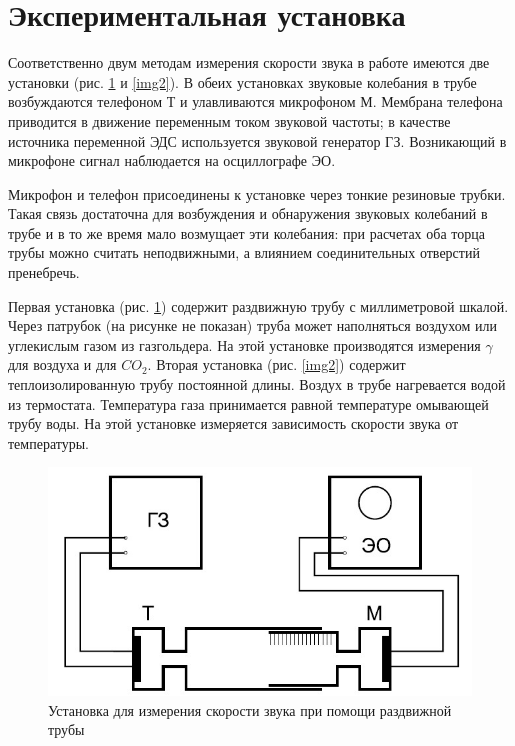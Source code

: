 \documentclass[a4paper,12pt]{article}
\theoremstyle{definition}
\begin{document}
	\section{Экспериментальная установка}
	
	Соответственно двум методам измерения скорости звука в работе имеются две установки (рис. \ref{img1} и \ref{img2}). В обеих установках звуковые колебания в трубе возбуждаются телефоном Т и улавливаются микрофоном М. Мембрана телефона приводится в движение переменным током звуковой частоты; в качестве источника переменной ЭДС используется звуковой генератор ГЗ. Возникающий в микрофоне сигнал наблюдается на осциллографе ЭО.
	
	Микрофон и телефон присоединены к установке через тонкие резиновые трубки. Такая связь достаточна для возбуждения и обнаружения звуковых колебаний в трубе и в то же время мало возмущает эти колебания: при расчетах оба торца трубы можно считать неподвижными, а влиянием соединительных отверстий пренебречь.
	
	Первая установка (рис. \ref{img1}) содержит раздвижную трубу с миллиметровой шкалой. Через патрубок (на рисунке не показан) труба может наполняться воздухом или углекислым газом из газгольдера. На этой установке производятся измерения $ \gamma $ для воздуха и для $ CO_2 $. Вторая установка (рис. \ref{img2}) содержит теплоизолированную трубу постоянной длины. Воздух в трубе нагревается водой из термостата. Температура газа принимается равной температуре омывающей трубу воды. На этой установке измеряется зависимость скорости звука от температуры.
	
	\begin{figure}[H]
		\begin{center}
			\includegraphics[width=12cm]{ust1.jpg}
		\end{center}
		\caption{Установка для измерения скорости звука при помощи раздвижной трубы}
		\label{img1}
	\end{figure}
	
\end{document}
